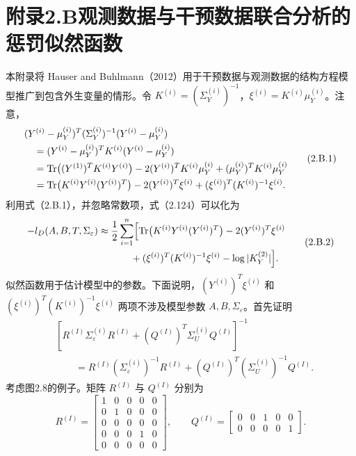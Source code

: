 \section*{附录2.B\quad 观测数据与干预数据联合分析的惩罚似然函数}

本附录将 Hauser and Buhlmann（2012）用于干预数据与观测数据的结构方程模型推广到包含外生变量的情形。令 $K^{(i)}=(\Sigma_Y^{(i)})^{-1}$，$\xi^{(i)}=K^{(i)}\mu_Y^{(i)}$。注意，
\begin{equation}
\begin{aligned}
&(Y^{(i)}-\mu_Y^{(i)})^T(\Sigma_Y^{(i)})^{-1}(Y^{(i)}-\mu_Y^{(i)})\\
&\quad=(Y^{(i)}-\mu_Y^{(i)})^TK^{(i)}(Y^{(i)}-\mu_Y^{(i)})\\
&\quad=\operatorname{Tr}\bigl((Y^{(1)})^TK^{(i)}Y^{(i)}\bigr)
 -2(Y^{(i)})^TK^{(i)}\mu_Y^{(i)}
 +(\mu_Y^{(i)})^TK^{(i)}\mu_Y^{(i)}\\
&\quad=\operatorname{Tr}\bigl(K^{(i)}Y^{(i)}(Y^{(i)})^T\bigr)
 -2(Y^{(i)})^T\xi^{(i)}
 +(\xi^{(i)})^T(K^{(i)})^{-1}\xi^{(i)}.
\end{aligned}\tag{2.B.1}
\end{equation}
利用式（2.B.1），并忽略常数项，式（2.124）可以化为
\begin{equation}
\begin{aligned}
-l_D(A,B,T,\Sigma_\varepsilon)
 \approx{}&\frac12\sum_{i=1}^n
 \Bigl[\operatorname{Tr}\bigl(K^{(i)}Y^{(i)}(Y^{(i)})^T\bigr)
       -2(Y^{(i)})^T\xi^{(i)}\\
 &\qquad+(\xi^{(i)})^T(K^{(i)})^{-1}\xi^{(i)}
       -\log|K_Y^{(2)}|\Bigr].
\end{aligned}\tag{2.B.2}
\end{equation}
似然函数用于估计模型中的参数。下面说明，$(Y^{(i)})^T\xi^{(i)}$ 和 $(\xi^{(i)})^T(K^{(i)})^{-1}\xi^{(i)}$ 两项不涉及模型参数 $A,B,\Sigma_\varepsilon$。首先证明
\begin{equation}
\begin{aligned}
&\left[R^{(I)}\Sigma_\varepsilon^{(i)}R^{(I)}
 +(Q^{(I)})^T\Sigma_U^{(i)}Q^{(I)}\right]^{-1}\\
&\qquad=R^{(I)}(\Sigma_\varepsilon^{(i)})^{-1}R^{(I)}
 +(Q^{(I)})^T(\Sigma_U^{(i)})^{-1}Q^{(I)}.
\end{aligned}\tag{2.B.3}
\end{equation}
考虑图2.8的例子。矩阵 $R^{(I)}$ 与 $Q^{(I)}$ 分别为
\[
R^{(I)}=\begin{bmatrix}
1&0&0&0&0\\
0&1&0&0&0\\
0&0&0&0&0\\
0&0&0&1&0\\
0&0&0&0&0
\end{bmatrix},
\qquad
Q^{(I)}=\begin{bmatrix}
0&0&1&0&0\\
0&0&0&0&1
\end{bmatrix}.
\]

